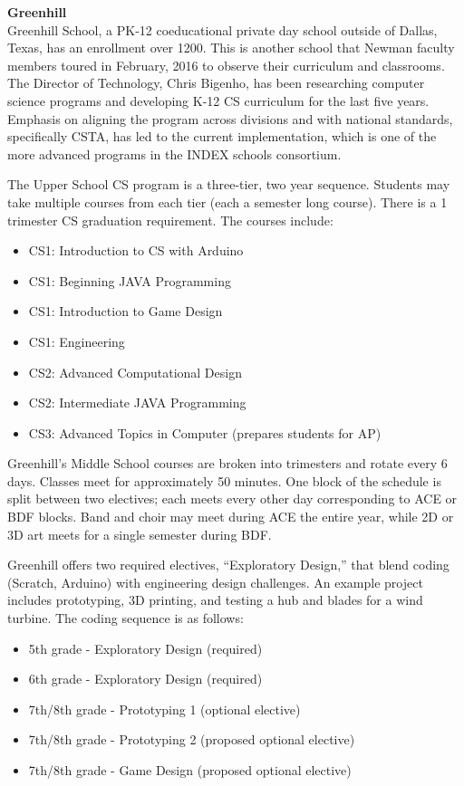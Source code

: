 \textbf{Greenhill} \\
Greenhill School, a PK-12 coeducational private day school outside of Dallas, Texas, has an enrollment over 1200. This is another school that Newman faculty members toured in February, 2016 to observe their curriculum and classrooms. The Director of Technology, Chris Bigenho, has been researching computer science programs and developing K-12 CS curriculum for the last five years. Emphasis on aligning the program across divisions and with national standards, specifically CSTA, has led to the current implementation, which is one of the more advanced programs in the INDEX schools consortium. \par 
The Upper School CS program is a three-tier, two year sequence. Students may take multiple courses from each tier (each a semester long course). There is a 1 trimester CS graduation requirement. The courses include:
\begin{itemize} 
	\item CS1: Introduction to CS with Arduino
	\item CS1: Beginning JAVA Programming 
	\item CS1: Introduction to Game Design 
	\item CS1: Engineering
	\item CS2: Advanced Computational Design
	\item CS2: Intermediate JAVA Programming
	\item CS3: Advanced Topics in Computer (prepares students for AP)
\end{itemize}
Greenhill’s Middle School courses are broken into trimesters and rotate every 6 days. Classes meet for approximately 50 minutes. One block of the schedule is split between two electives; each meets every other day corresponding to ACE or BDF blocks. Band and choir may meet during ACE the entire year, while 2D or 3D art meets for a single semester during BDF. \par
Greenhill offers two required electives, ``Exploratory Design,'' that blend coding (Scratch, Arduino) with engineering design challenges. An example project includes prototyping, 3D printing, and testing a hub and blades for a wind turbine. The coding sequence is as follows:
\begin{itemize}
	\item 5th grade - Exploratory Design (required)
	\item 6th grade - Exploratory Design (required)
	\item 7th/8th grade - Prototyping 1 (optional elective)
	\item 7th/8th grade - Prototyping 2 (proposed optional elective)
	\item 7th/8th grade - Game Design (proposed optional elective)
\end{itemize}
